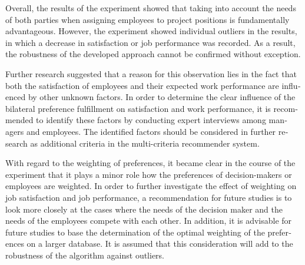 \begin{otherlanguage}{american}
	Overall, the results of the experiment showed that taking into account the needs of both parties when assigning employees to project positions is fundamentally advantageous.
	However, the experiment showed individual outliers in the results, in which a decrease in satisfaction or job performance was recorded.
	As a result, the robustness of the developed approach cannot be confirmed without exception.

	Further research suggested that a reason for this observation lies in the fact that both the satisfaction of employees and their expected work performance are influenced by other unknown factors.
	In order to determine the clear influence of the bilateral preference fulfillment on satisfaction and work performance, it is recommended to identify these factors by conducting expert interviews among managers and employees.
	The identified factors should be considered in further research as additional criteria in the multi-criteria recommender system.

	With regard to the weighting of preferences, it became clear in the course of the experiment that it plays a minor role how the preferences of decision-makers or employees are weighted.
	In order to further investigate the effect of weighting on job satisfaction and job performance, a recommendation for future studies is to look more closely at the cases where the needs of the decision maker and the needs of the employees compete with each other.
	In addition, it is advisable for future studies to base the determination of the optimal weighting of the preferences on a larger database.
	It is assumed that this consideration will add to the robustness of the algorithm against outliers.

\end{otherlanguage}
